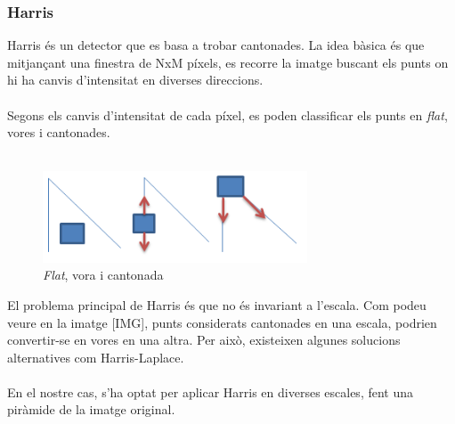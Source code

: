 	\subsubsection{Harris}
	Harris és un detector que es basa a trobar cantonades. La idea bàsica és que mitjançant una finestra de NxM píxels, es recorre la imatge buscant els punts on hi ha canvis d'intensitat
	en diverses direccions.\\\\
	Segons els canvis d'intensitat de cada píxel, es poden classificar els punts en \textit{flat}, vores i cantonades.\\\\
	\begin{figure}[H]
		\centering
		\includegraphics[width=0.7\textwidth]{images/harris}
		\caption{\textit{Flat}, vora i cantonada}
	\end{figure}
	\noindent
	El problema principal de Harris és que no és invariant a l'escala. Com podeu veure en la imatge [IMG], punts considerats cantonades en una escala,
	podrien convertir-se en vores en una altra. Per això, existeixen algunes solucions alternatives com Harris-Laplace.\\\\
	[IMAGE]
	En el nostre cas, s'ha optat per aplicar Harris en diverses escales, fent una piràmide de la imatge original.


